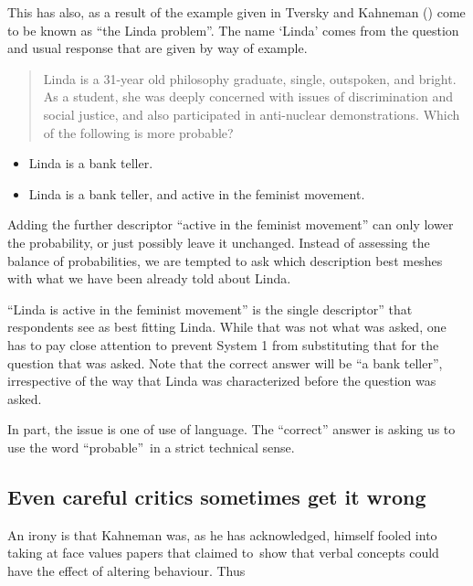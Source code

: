 \documentclass[
  10ptls,
  b5paper]{book}
\providecommand{\tightlist}{%
  \setlength{\itemsep}{0pt}\setlength{\parskip}{0pt}}
\begin{document}
This has also, as a result of the example given in
Tversky and Kahneman () come to be known as ``the Linda problem''.
The name `Linda' comes from the question and usual response
that are given by way of example.

\begin{quote}
Linda is a 31-year old philosophy graduate, single, outspoken, and bright. As a student, she was deeply concerned with issues of discrimination and social justice, and also participated in anti-nuclear demonstrations. Which of the following is more probable?
\end{quote}

\begin{itemize}
\tightlist
\item
  Linda is a bank teller.
\item
  Linda is a bank teller, and active in the feminist movement.
\end{itemize}

Adding the further descriptor ``active in the feminist movement'' can only lower the probability, or just possibly leave it unchanged. Instead of assessing the balance of probabilities, we are tempted to ask which description best meshes with what we have been already told about Linda.

``Linda is active in the feminist movement'' is the single descriptor'' that respondents see as best fitting Linda. While that was not what was asked, one has to pay close attention to prevent System 1 from substituting that for the question that was asked. Note that the correct answer will be ``a bank teller'', irrespective of the way that Linda was characterized before the question was asked.

In part, the issue is one of use of language. The ``correct'' answer is asking us to use the word ``probable''~in a strict technical sense.

\subsection*{Even careful critics sometimes get it wrong}\label{even-careful-critics-sometimes-get-it-wrong}

An irony is that Kahneman was, as he has acknowledged, himself fooled into taking at face values papers that claimed to~show that verbal concepts could have the effect of altering behaviour. Thus
\end{document}
